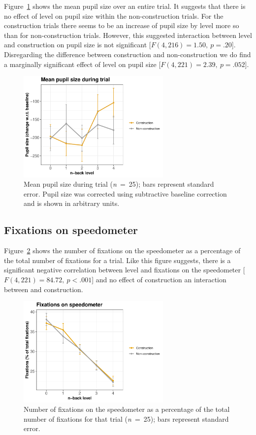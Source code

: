 Figure~\ref{fig:mean-ps} shows the mean pupil size over an entire trial. 
It suggests that there is no effect of \nback level on pupil size within the non-construction trials.
For the construction trials there seems to be an increase of pupil size by \nback level more so than for non-construction trials.
However, this suggested interaction between \nback level and construction on pupil size is not significant [\(F(4,216)=1.50,\ p=.20\)].
Disregarding the difference between construction and non-construction we do find a marginally significant effect of \nback level on pupil size [\(F(4,221)=2.39,\ p=.052\)].

\begin{figure}[tp]
  \centering
  \includegraphics[width=7.5cm]{images/pupil_size_interaction.pdf}
  \caption{Mean pupil size during trial (\textit{n}\ =\ 25); bars represent standard error.
  Pupil size was corrected using subtractive baseline correction and is shown in arbitrary units.}
  \label{fig:mean-ps}
\end{figure}

\subsection{Fixations on speedometer}
Figure~\ref{fig:fix-speedometer} shows the number of fixations on the speedometer as a percentage of the total number of fixations for a trial.
Like this figure suggests, there is a significant negative correlation between \nback level and fixations on the speedometer [\(F(4,221)=84.72,\ p<.001\)] 
and no effect of construction an interaction between \nback and construction. 

\begin{figure}[!t]
  \centering
  \includegraphics[width=7.5cm]{images/speedometer_interaction.pdf}
  \caption{Number of fixations on the speedometer as a percentage of the total number of fixations for that trial (\textit{n}\ =\ 25); bars represent standard error.}
  \label{fig:fix-speedometer}
\end{figure}